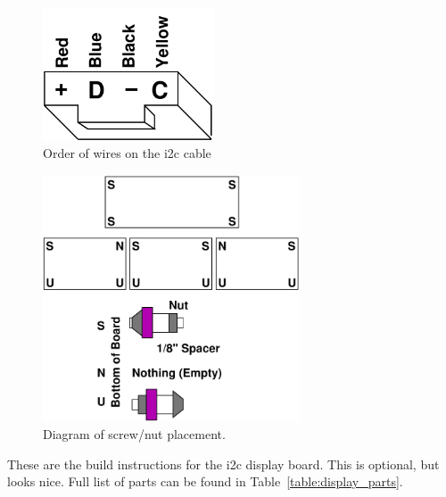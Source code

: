 \documentclass[11pt]{article}
\begin{document}
\begin{figure}[tbp]
\centering
\includegraphics[width=2in]{figs/i2cwire.pdf}
\caption{Order of wires on the i2c cable~\label{figs:i2ccable}}
\end{figure}

\begin{figure}[tbp]
\centering
\includegraphics[width=3in]{figs/nut_diagram.pdf}
\caption{Diagram of screw/nut placement.~\label{figs:nut_diagram}}
\end{figure}

These are the build instructions for the i2c display board.
This is optional, but looks nice.
Full list of parts can be found in Table~\ref{table:display_parts}.
\end{document}
